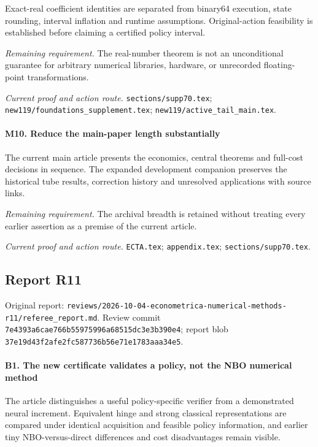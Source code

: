 Exact-real coefficient identities are separated from binary64 execution, state rounding, interval inflation and runtime assumptions. Original-action feasibility is established before claiming a certified policy interval.

\par\emph{Remaining requirement.} The real-number theorem is not an unconditional guarantee for arbitrary numerical libraries, hardware, or unrecorded floating-point transformations.

\par\emph{Current proof and action route.} \nolinkurl{sections/supp70.tex}; \nolinkurl{new119/foundations_supplement.tex}; \nolinkurl{new119/active_tail_main.tex}.

\paragraph{M10. Reduce the main-paper length substantially}

The current main article presents the economics, central theorems and full-cost decisions in sequence. The expanded development companion preserves the historical tube results, correction history and unresolved applications with source links.

\par\emph{Remaining requirement.} The archival breadth is retained without treating every earlier assertion as a premise of the current article.

\par\emph{Current proof and action route.} \nolinkurl{ECTA.tex}; \nolinkurl{appendix.tex}; \nolinkurl{sections/supp70.tex}.

\subsection{Report R11}

Original report: \nolinkurl{reviews/2026-10-04-econometrica-numerical-methods-r11/referee_report.md}. Review commit \nolinkurl{7e4393a6cae766b55975996a68515dc3e3b390e4}; report blob \nolinkurl{37e19d43f2afe2fc587736b56e71e1783aaa34e5}.

\paragraph{B1. The new certificate validates a policy, not the NBO numerical method}

The article distinguishes a useful policy-specific verifier from a demonstrated neural increment. Equivalent hinge and strong classical representations are compared under identical acquisition and feasible policy information, and earlier tiny NBO-versus-direct differences and cost disadvantages remain visible.

